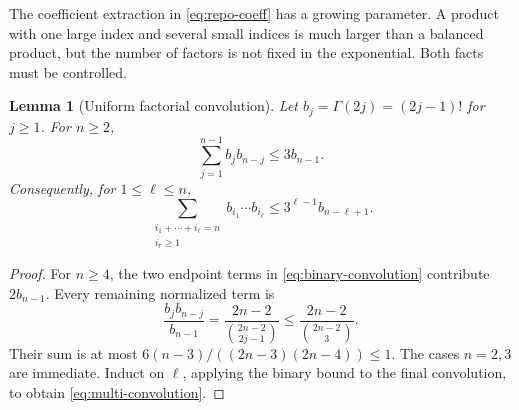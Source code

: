 \documentclass[11pt,a4paper]{article}
\newtheorem{lemma}[theorem]{Lemma}
\theoremstyle{definition}
\numberwithin{equation}{section}
\begin{document}
The coefficient extraction in \eqref{eq:repo-coeff} has a growing parameter. A product with one large index and several small indices is much larger than a balanced product, but the number of factors is not fixed in the exponential. Both facts must be controlled.

\begin{lemma}[Uniform factorial convolution]
\label{lem:convolution}
Let $b_j=\Gamma(2j)=(2j-1)!$ for $j\ge1$. For $n\ge2$,
\begin{equation}
 \sum_{j=1}^{n-1}b_jb_{n-j}\le3b_{n-1}.
 \label{eq:binary-convolution}
\end{equation}
Consequently, for $1\le\ell\le n$,
\begin{equation}
 \sum_{\substack{i_1+\cdots+i_\ell=n\\ i_r\ge1}}
       b_{i_1}\cdots b_{i_\ell}
 \le3^{\ell-1}b_{n-\ell+1}.
 \label{eq:multi-convolution}
\end{equation}
\end{lemma}
\begin{proof}
For $n\ge4$, the two endpoint terms in \eqref{eq:binary-convolution} contribute $2b_{n-1}$. Every remaining normalized term is
\[
 \frac{b_jb_{n-j}}{b_{n-1}}
   =\frac{2n-2}{\binom{2n-2}{2j-1}}
   \le\frac{2n-2}{\binom{2n-2}{3}}.
\]
Their sum is at most
$6(n-3)/((2n-3)(2n-4))\le1$. The cases $n=2,3$ are immediate. Induct on $\ell$, applying the binary bound to the final convolution, to obtain \eqref{eq:multi-convolution}.
\end{proof}
\end{document}
